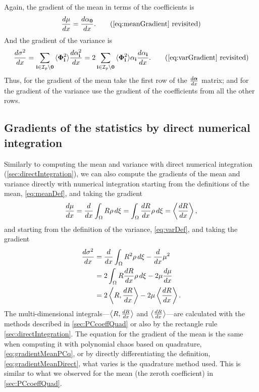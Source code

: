 Again, the gradient of the mean in terms of the coefficients is
\begin{equation}
  \frac{d\mu}{dx} = \frac{d\alpha_\mathbf{0}}{dx}. \tag{\ref{eq:meanGradient} revisited}
\end{equation}
And the gradient of the variance is
\begin{equation}
  \frac{d\sigma^2}{dx} = \sum_{\bi\in \mathcal{I}_p\setminus \mathbf{0}} {\braket{\bPhi_\bi^2}} \frac{d\alpha_\bi^2}{dx}
  = 2 \sum_{\bi\in \mathcal{I}_p\setminus \mathbf{0}} {\braket{\bPhi_\bi^2}} \alpha_\bi \frac{d\alpha_\bi}{dx}.
  \tag{\ref{eq:varGradient} revisited}
\end{equation}
Thus, for the gradient of the mean take the first row of the $ \frac{d\boldsymbol{\alpha}}{dx} $ matrix; and for the gradient of the variance use the gradient of the coefficients from all the other rows.


\subsection{Gradients of the statistics by direct numerical integration}
Similarly to computing the mean and variance with direct numerical integration (\cref{sec:directIntegration}), we can also compute the gradients of the mean and variance directly with numerical integration starting from the definitions of the mean, \cref{eq:meanDef}, and taking the gradient
\begin{equation}
  \frac{d\mu}{dx} = \frac{d}{dx} \int_{\Omega}R\rho \,d\xi =  \int_{\Omega}\frac{dR}{dx}\rho \, d\xi = \Braket{\frac{dR}{dx}},
  \label{eq:gradientMeanDirect}
\end{equation}
and starting from the definition of the variance, \cref{eq:varDef}, and taking the gradient
\begin{align}
  \frac{d\sigma^2}{dx} & = \frac{d}{dx} \int_{\Omega}R^2\rho \,d\xi - \frac{d}{dx} \mu^2 \\
  & = 2 \int_{\Omega} R \frac{dR}{dx}\rho \,d\xi - 2 \mu \frac{d\mu}{dx} \\
  & = 2 \Braket{R, \frac{dR}{dx}} - 2\mu\Braket{\frac{dR}{dx}}.
\end{align}
The multi-dimensional integrals---$\Braket{R, \frac{dR}{dx}}$ and $\Braket{\frac{dR}{dx}}$---are calculated with the methods described in \cref{sec:PCcoeffQuad} or also by the rectangle rule \cref{sec:directIntegration}. The equation for the gradient of the mean is the same when computing it with polynomial chaos based on quadrature, \cref{eq:gradientMeanPCq}, or by directly differentiating the definition, \cref{eq:gradientMeanDirect}, what varies is the quadrature method used. This is similar to what we observed for the mean (the zeroth coefficient) in \cref{sec:PCcoeffQuad}.

